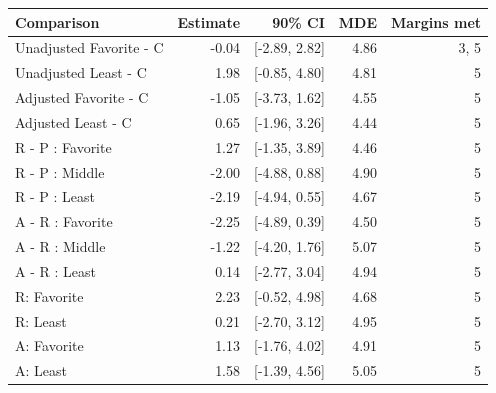 \begin{tabular}{@{}p{6cm}rrrr@{}}
\toprule
Comparison & Estimate & 90\% CI & MDE & Margins met \\
\midrule
Unadjusted Favorite - C & -0.04 & [-2.89, 2.82] & 4.86 & 3, 5 \\
Unadjusted Least - C & 1.98 & [-0.85, 4.80] & 4.81 & 5 \\
Adjusted Favorite - C & -1.05 & [-3.73, 1.62] & 4.55 & 5 \\
Adjusted Least - C & 0.65 & [-1.96, 3.26] & 4.44 & 5 \\
R - P : Favorite & 1.27 & [-1.35, 3.89] & 4.46 & 5 \\
R - P : Middle & -2.00 & [-4.88, 0.88] & 4.90 & 5 \\
R - P : Least & -2.19 & [-4.94, 0.55] & 4.67 & 5 \\
A - R : Favorite & -2.25 & [-4.89, 0.39] & 4.50 & 5 \\
A - R : Middle & -1.22 & [-4.20, 1.76] & 5.07 & 5 \\
A - R : Least & 0.14 & [-2.77, 3.04] & 4.94 & 5 \\
R: Favorite & 2.23 & [-0.52, 4.98] & 4.68 & 5 \\
R: Least & 0.21 & [-2.70, 3.12] & 4.95 & 5 \\
A: Favorite & 1.13 & [-1.76, 4.02] & 4.91 & 5 \\
A: Least & 1.58 & [-1.39, 4.56] & 5.05 & 5 \\
\bottomrule
\end{tabular}
